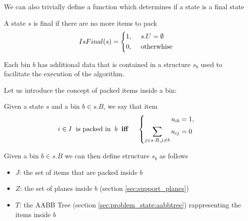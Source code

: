We can also trivially define a function which determines if a state is a final state
\begin{definition}
    \label{def:state_final}
    A state $s$ is final if there are no more items to pack
    \begin{equation}
        \label{algo:state_final}%
        IsFinal(s) = \left\{\begin{aligned}
            1,\hspace{0.5cm}& s.U = \emptyset \\
            0,\hspace{0.5cm}& \text{otherwhise}
        \end{aligned}
        \right.
    \end{equation}
\end{definition}

Each bin $b$ has additional data that is contained in a structure $s_b$ used to facilitate the execution of the algorithm. 

Let us introduce the concept of packed items inside a bin:
\begin{definition}
    Given a state $s$ and a bin $b \in s.B$, we say that item
    \begin{equation*}
        \begin{aligned}
            i \in I \hspace{.2cm}\text{is packed in} \hspace{.2cm}b \hspace{.2cm}& \textbf{iff} \hspace{.2cm}& \left\{ 
                \begin{aligned}
                    u_{ib} & = 1, \\
                    \sum_{j \in s.B, j \neq b}{u_{ij}} & = 0
                \end{aligned}
            \right.
        \end{aligned}
    \end{equation*}
\end{definition}

Given a bin $b \in s.B$ we can then define structure $s_b$ as follows
\begin{itemize}
    \item $J$: the set of items that are packed inside $b$
    \item $Z$: the set of planes inside $b$ (section \ref{sec:support_planes})
    \item $T$: the AABB Tree (section \ref{sec:problem_state:aabbtree}) rappresenting the items inside $b$
\end{itemize}

